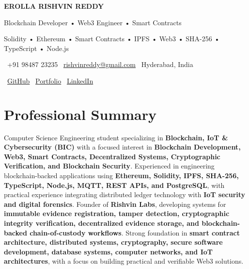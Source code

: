 \documentclass[a4paper,11pt]{article}
\begin{document}

\begin{center}

{\Huge \textbf{EROLLA RISHVIN REDDY}}

\vspace{4pt}

{\large Blockchain Developer • Web3 Engineer • Smart Contracts}

\vspace{5pt}

{\small
Solidity • Ethereum • Smart Contracts • IPFS • Web3 • SHA-256 • TypeScript • Node.js
}

\vspace{8pt}

\small
\faPhone\ +91 98487 23235
\hspace{12pt}
\faEnvelope\ \href{mailto:rishvinreddy@gmail.com}{rishvinreddy@gmail.com}
\hspace{12pt}
\faMapMarker*\ Hyderabad, India

\vspace{6pt}

\faGithub\
\href{https://github.com/RishvinReddy}{GitHub}
\hspace{14pt}
\faGlobe\
\href{https://rishvinreddy.vercel.app}{Portfolio}
\hspace{14pt}
\faLinkedin\
\href{https://www.linkedin.com/in/rishvinreddy/}{LinkedIn}

\end{center}

\vspace{-8pt}


\section{Professional Summary}

Computer Science Engineering student specializing in \textbf{Blockchain, IoT \& Cybersecurity (BIC)} with a focused interest in \textbf{Blockchain Development, Web3, Smart Contracts, Decentralized Systems, Cryptographic Verification, and Blockchain Security}. Experienced in engineering blockchain-backed applications using \textbf{Ethereum, Solidity, IPFS, SHA-256, TypeScript, Node.js, MQTT, REST APIs, and PostgreSQL}, with practical experience integrating distributed ledger technology with \textbf{IoT security and digital forensics}. Founder of \textbf{Rishvin Labs}, developing systems for \textbf{immutable evidence registration, tamper detection, cryptographic integrity verification, decentralized evidence storage, and blockchain-backed chain-of-custody workflows}. Strong foundation in \textbf{smart contract architecture, distributed systems, cryptography, secure software development, database systems, computer networks, and IoT architectures}, with a focus on building practical and verifiable Web3 solutions.
\end{document}
